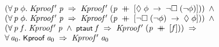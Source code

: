 \documentclass{report}
\renewcommand{\HOLConst}[1]{{\textsf{\upshape\small #1}}}
\newenvironment{holmath}{\begin{displaymath}\begin{array}{l}}{\end{array}\end{displaymath}\ignorespacesafterend}
\begin{document}
\begin{holmath}
\;\;\;\;\;(\HOLSymConst{\HOLTokenForall{}}\HOLBoundVar{p}\;\HOLBoundVar{\ensuremath{\phi}}.\;\HOLFreeVar{Kproof\sp{\prime}}\;\HOLBoundVar{p}\;\HOLSymConst{\HOLTokenImp{}}\;\HOLFreeVar{Kproof\sp{\prime}}\;(\HOLBoundVar{p}\;\HOLSymConst{\HOLTokenDoublePlus}\;[\HOLSymConst{\ensuremath{\Diamond}}\;\HOLBoundVar{\ensuremath{\phi}}\;\HOLSymConst{\ensuremath{\rightarrow}}\;\HOLSymConst{\HOLTokenNeg{}}\HOLSymConst{\ensuremath{\Box}}\;(\HOLSymConst{\HOLTokenNeg{}}\HOLBoundVar{\ensuremath{\phi}})]))\;\HOLSymConst{\HOLTokenConj{}}\\
\;\;\;\;\;(\HOLSymConst{\HOLTokenForall{}}\HOLBoundVar{p}\;\HOLBoundVar{\ensuremath{\phi}}.\;\HOLFreeVar{Kproof\sp{\prime}}\;\HOLBoundVar{p}\;\HOLSymConst{\HOLTokenImp{}}\;\HOLFreeVar{Kproof\sp{\prime}}\;(\HOLBoundVar{p}\;\HOLSymConst{\HOLTokenDoublePlus}\;[\HOLSymConst{\HOLTokenNeg{}}\HOLSymConst{\ensuremath{\Box}}\;(\HOLSymConst{\HOLTokenNeg{}}\HOLBoundVar{\ensuremath{\phi}})\;\HOLSymConst{\ensuremath{\rightarrow}}\;\HOLSymConst{\ensuremath{\Diamond}}\;\HOLBoundVar{\ensuremath{\phi}}]))\;\HOLSymConst{\HOLTokenConj{}}\\
\;\;\;\;\;(\HOLSymConst{\HOLTokenForall{}}\HOLBoundVar{p}\;\HOLBoundVar{f}.\;\HOLFreeVar{Kproof\sp{\prime}}\;\HOLBoundVar{p}\;\HOLSymConst{\HOLTokenConj{}}\;\HOLConst{ptaut}\;\HOLBoundVar{f}\;\HOLSymConst{\HOLTokenImp{}}\;\HOLFreeVar{Kproof\sp{\prime}}\;(\HOLBoundVar{p}\;\HOLSymConst{\HOLTokenDoublePlus}\;[\HOLBoundVar{f}]))\;\HOLSymConst{\HOLTokenImp{}}\\
\;\;\;\;\;\HOLSymConst{\HOLTokenForall{}}\HOLBoundVar{a\sb{\mathrm{0}}}.\;\HOLConst{Kproof}\;\HOLBoundVar{a\sb{\mathrm{0}}}\;\HOLSymConst{\HOLTokenImp{}}\;\HOLFreeVar{Kproof\sp{\prime}}\;\HOLBoundVar{a\sb{\mathrm{0}}}
\end{holmath}
\end{document}
